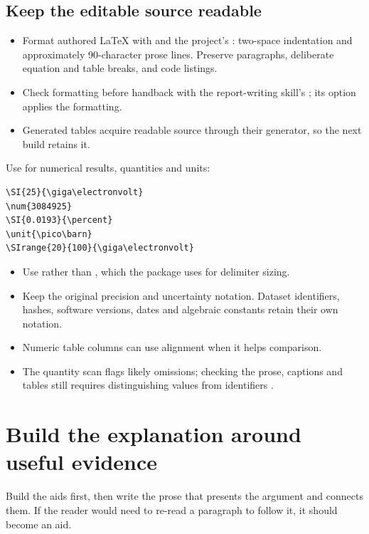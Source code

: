 \subsection{Keep the editable source readable}

\begin{itemize}
  \item Format authored LaTeX with  and the project's :
        two-space indentation and approximately 90-character prose lines. Preserve paragraphs,
        deliberate equation and table breaks, and code listings.
  \item Check formatting before handback with the report-writing skill's
        ; its  option applies the formatting.
  \item Generated tables acquire readable source through their generator, so the next build
        retains it.
\end{itemize}

Use  for numerical results, quantities and units:
\begin{lstlisting}
\SI{25}{\giga\electronvolt}
\num{3084925}
\SI{0.0193}{\percent}
\unit{\pico\barn}
\SIrange{20}{100}{\giga\electronvolt}
\end{lstlisting}
\begin{itemize}
  \item Use \code{\SI} rather than \code{\qty}, which the  package uses for
        delimiter sizing.
  \item Keep the original precision and uncertainty notation. Dataset identifiers, hashes,
        software versions, dates and algebraic constants retain their own notation.
  \item Numeric table columns can use  alignment when it helps comparison.
  \item The quantity scan flags likely omissions; checking the prose, captions and tables still
        requires distinguishing values from identifiers \cite[Readable source and numerical
          presentation]{skill:report-production}.
\end{itemize}

\section{Build the explanation around useful evidence}

\begin{headline}
  Build the aids first, then write the prose that presents the argument and connects them.
  If the reader would need to re-read a paragraph to follow it, it should become an aid.
\end{headline}

